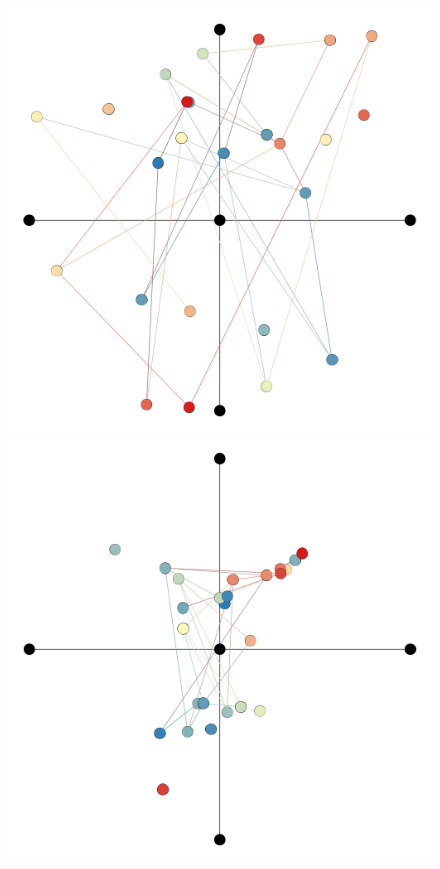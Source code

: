 \documentclass[11pt]{article}
\begin{document}
\begin{figure}[h!]
  \includegraphics[width=\linewidth]{images/Evolutions/WBG25_0.png}
\endminipage\hfill
{}
\centering
  \includegraphics[width=\linewidth]{images/Evolutions/WBG25_300.png}

\end{figure}
\end{document}
